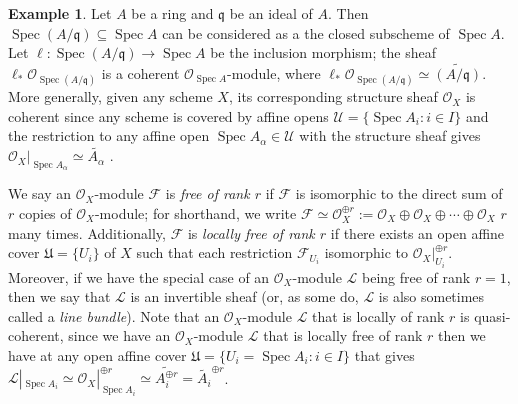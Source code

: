 \documentclass[oneside]{amsart}
\theoremstyle{definition}
\DeclareMathOperator{\spec}{Spec}
\newtheorem{ex}{Example}[section]
\begin{document}
\begin{ex}
Let $A$ be a ring and $\mathfrak q$ be 	an ideal of $A$. Then $\spec (A/\mathfrak q) \subseteq \spec A$ can be considered as a the closed subscheme of $\spec A$. Let $\ell \colon \spec (A/\mathfrak q) \to \spec A$ be the inclusion morphism; the sheaf $\ell_{\ast} \mathscr O_{\spec (A/\mathfrak q )}$ is a coherent $\mathscr O_{\spec A}$-module, where $\ell_{\ast} \mathscr O_{\spec (A/\mathfrak q)} \simeq \widetilde{(A/\mathfrak q)}$. More generally, given any scheme $X$, its corresponding structure sheaf $\mathscr O_X$ is coherent since any scheme is covered by affine opens $\mathcal U = \{ \spec A_i \colon i \in I \}$ and the restriction to any affine open $\spec A_\alpha \in \mathcal U$ with the structure sheaf gives $\mathscr O_X |_{\spec A_\alpha} \simeq \widetilde{A_\alpha}$
.\end{ex}

We say an $\mathscr O_X$-module $\mathscr F$ is \textit{free of rank $r$} if $\mathscr F$ is isomorphic to the direct sum of $r$ copies of $\mathscr O_X$-module; for shorthand, we write $\mathscr F \simeq \mathscr O_X^{\oplus r} := \mathscr O_X \oplus \mathscr O_X \oplus \cdots \oplus \mathscr O_X $ $r$ many times. Additionally, $\mathscr F$ is \textit{locally free of rank $r$} if there exists an open affine cover $\mathfrak U = \{U_i \}$ of $X$ such that each restriction $\mathscr F_{U_i}$ isomorphic to $\mathscr O_X |_{U_i} ^{\oplus r}$. Moreover, if we have the special case of an $\mathscr O_X$-module $\mathscr L$ being free of rank $r=1$, then we say that $\mathscr L$ is an invertible sheaf (or, as some do, $\mathscr L$ is also sometimes called a \textit{line bundle}). Note that an $\mathscr O_X$-module $\mathscr L$ that is locally of rank $r$ is quasi-coherent, since we have an $\mathscr O_X$-module $\mathscr L$ that is locally free of rank $r$ then we have at any open affine cover $\mathfrak U = \{ U_i = \spec A_i \colon i \in I \}$ that gives $\mathscr L |_{\spec A_i} \simeq \mathscr O_X|_{\spec A_i}^{\oplus r } \simeq \widetilde{A_i^{\oplus r}} = \widetilde{A_i}^{\oplus r}$.
\end{document}
